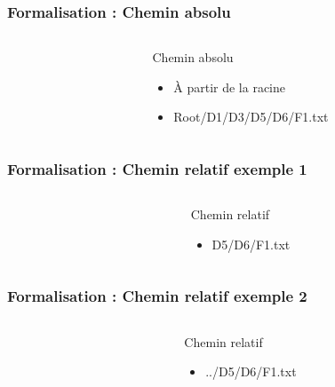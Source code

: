 \documentclass[table,svgnames,hyperref={pdfpagemode=FullScreen}]{beamer}
\begin{document}
\begin{frame}
		\frametitle{Formalisation : Chemin absolu}
		\begin{columns}
			\begin{column}[l]{5cm}
				
			\end{column}
			\begin{column}[r]{5cm}
				\begin{block}{Chemin absolu}
					\begin{itemize}
						\item À partir de la racine 
						\item Root/D1/D3/D5/D6/F1.txt
					\end{itemize}
				\end{block}
			\end{column}
		\end{columns}
\end{frame}

\begin{frame}
		\frametitle{Formalisation : Chemin relatif exemple 1}
		\begin{columns}
			\begin{column}[l]{5cm}
				
			\end{column}
			\begin{column}[r]{5cm}
				\begin{block}{Chemin relatif}
					\begin{itemize}
						\item D5/D6/F1.txt
					\end{itemize}
				\end{block}
			\end{column}
		\end{columns}
\end{frame}

\begin{frame}
		\frametitle{Formalisation : Chemin relatif exemple 2}
		\begin{columns}
			\begin{column}[l]{5cm}
				
			\end{column}
			\begin{column}[r]{5cm}
				\begin{block}{Chemin relatif}
					\begin{itemize}
						\item ../D5/D6/F1.txt
					\end{itemize}
				\end{block}
			\end{column}
		\end{columns}
\end{frame}
\end{document}
